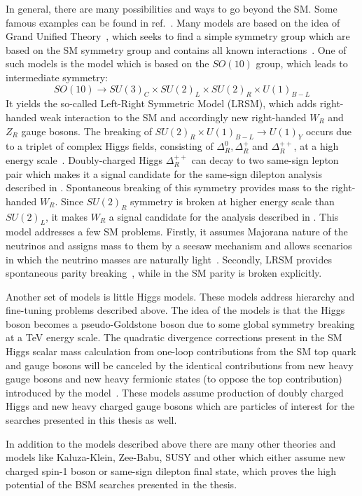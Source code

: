 In general, there are many possibilities and ways to go beyond the SM. 
Some famous examples can be found in ref.~\cite{Ellis:2011jb}.
Many models are based on the idea of Grand Unified Theory~\cite{GUT_bigPaper},
which seeks to find a simple symmetry group which are based on the SM symmetry group
and contains all known interactions~\cite{Langacker:1984dc,Cvetic:1995zs}.
One of such models is the model which is based on the $SO(10)$ group, which leads to intermediate symmetry:
\begin{equation}
SO(10) \to SU(3)_C \times SU(2)_L \times SU(2)_R \times U(1)_{B-L}
\end{equation}
It yields the so-called Left-Right Symmetric Model (LRSM), which adds
right-handed weak interaction to the SM and accordingly new right-handed $W_R$ and $Z_R$ gauge bosons.
The breaking of $SU(2)_R \times U(1)_{B-L} \to U(1)_Y$ occurs due to a triplet of complex Higgs fields, consisting of $\Delta^0_R, \Delta^+_R$ and $\Delta^{++}_R$, at a high energy scale~\cite{Azuelos:2004mwa}.
Doubly-charged Higgs $\Delta^{++}_R$ can decay to two same-sign lepton pair which makes it a signal candidate for the same-sign dilepton analysis described in . Spontaneous breaking of this symmetry provides mass to the right-handed $W_R$.
Since $SU(2)_R$ symmetry is broken at higher energy scale than $SU(2)_L$, it makes
$W_R$ a signal candidate for the analysis described in .
This model addresses a few SM problems. Firstly, it assumes Majorana nature of the neutrinos and assigns mass to them by a seesaw mechanism and allows scenarios in which the neutrino masses are naturally light~\cite{Mohapatra:1979ia}. 
Secondly, LRSM provides spontaneous parity breaking~\cite{Grimus:1993fx}, while in the SM parity is broken explicitly.

Another set of models is little Higgs models.
These models address hierarchy and fine-tuning problems described above.
The idea of the models is that the Higgs boson becomes a pseudo-Goldstone boson due to some global symmetry breaking at a TeV energy scale.
The quadratic divergence corrections present in the SM Higgs scalar mass calculation from one-loop contributions from the SM top quark and gauge bosons will be canceled 
by the identical contributions from new heavy gauge bosons and new heavy fermionic states (to oppose the top contribution) introduced by the model~\cite{Han:2003wu,Brak}.
These models assume production of doubly charged Higgs and new heavy charged gauge bosons which are particles of interest for the searches presented in this thesis as well.

In addition to the models described above there are many other theories and models like Kaluza-Klein, Zee-Babu, SUSY and other which either assume new charged spin-1 boson or same-sign dilepton final state, which proves the high potential of the BSM searches presented in the thesis.